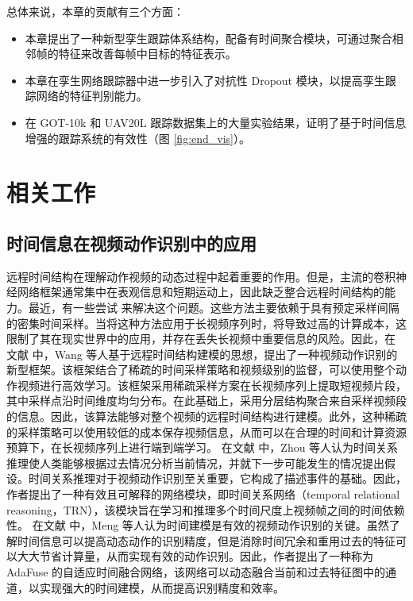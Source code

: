 总体来说，本章的贡献有三个方面：
\begin{itemize}
\item 本章提出了一种新型孪生跟踪体系结构，配备有时间聚合模块，可通过聚合相邻帧的特征来改善每帧中目标的特征表示。
\item 本章在孪生网络跟踪器中进一步引入了对抗性 Dropout 模块，以提高孪生跟踪网络的特征判别能力。
\item 在 GOT-10k \cite{GOT-10k} 和 UAV20L \cite{mueller2016benchmark} 跟踪数据集上的大量实验结果，证明了基于时间信息增强的跟踪系统的有效性（图 \ref{fig:end_vis}）。
\end{itemize}

\section{相关工作}
\subsection{时间信息在视频动作识别中的应用}
远程时间结构在理解动作视频的动态过程中起着重要的作用。但是，主流的卷积神经网络框架通常集中在表观信息和短期运动上，因此缺乏整合远程时间结构的能力。最近，有一些尝试 \cite{Motionlets} 来解决这个问题。这些方法主要依赖于具有预定采样间隔的密集时间采样。当将这种方法应用于长视频序列时，将导致过高的计算成本，这限制了其在现实世界中的应用，并存在丢失长视频中重要信息的风险。因此，在 文献 \cite{TSN} 中，Wang 等人基于远程时间结构建模的思想，提出了一种视频动作识别的新型框架。该框架结合了稀疏的时间采样策略和视频级别的监督，可以使用整个动作视频进行高效学习。该框架采用稀疏采样方案在长视频序列上提取短视频片段，其中采样点沿时间维度均匀分布。在此基础上，采用分层结构聚合来自采样视频段的信息。因此，该算法能够对整个视频的远程时间结构进行建模。此外，这种稀疏的采样策略可以使用较低的成本保存视频信息，从而可以在合理的时间和计算资源预算下，在长视频序列上进行端到端学习。%
在文献 \cite{TRN} 中，Zhou 等人认为时间关系推理使人类能够根据过去情况分析当前情况，并就下一步可能发生的情况提出假设。时间关系推理对于视频动作识别至关重要，它构成了描述事件的基础。因此，作者提出了一种有效且可解释的网络模块，即时间关系网络（temporal relational reasoning，TRN），该模块旨在学习和推理多个时间尺度上视频帧之间的时间依赖性。%
在文献 \cite{AdaFuse} 中，Meng 等人认为时间建模是有效的视频动作识别的关键。虽然了解时间信息可以提高动态动作的识别精度，但是消除时间冗余和重用过去的特征可以大大节省计算量，从而实现有效的动作识别。因此，作者提出了一种称为 AdaFuse 的自适应时间融合网络，该网络可以动态融合当前和过去特征图中的通道，以实现强大的时间建模，从而提高识别精度和效率。%

